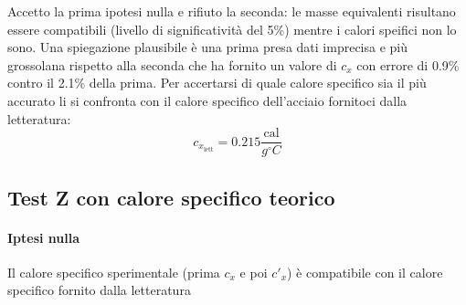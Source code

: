 \documentclass{article}
\begin{document}
	Accetto la prima ipotesi nulla e rifiuto la seconda: le masse equivalenti risultano essere compatibili (livello di significatività del 5\%) mentre i calori speifici non lo sono. Una spiegazione plausibile è una prima presa dati imprecisa e più grossolana rispetto alla seconda che ha fornito un valore di \(c_{x}\) con errore di 0.9\% contro il 2.1\% della prima. Per accertarsi di quale calore specifico sia il più accurato li si confronta con il calore specifico dell'acciaio fornitoci dalla letteratura:
	\[ 
	c_{x_{\text{lett}}} = 0.215 \frac{\text{cal}}{g ^\circ C}
	\]
	
	\subsection{Test Z con calore specifico teorico}
	\paragraph{Iptesi nulla} Il calore specifico sperimentale (prima \(c_{x}\) e poi \(c'_{x}\)) è compatibile con il calore specifico fornito dalla letteratura
	
\end{document}
